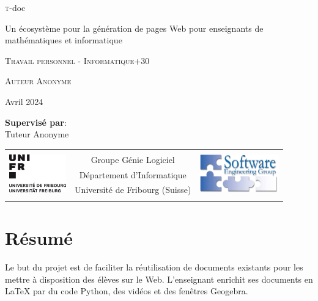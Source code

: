 \documentclass[12pt,titlepage,oneside]{article}
\newcommand{\authorname}{Caroline Blank}
\newcommand{\tutorname}{Prof. Dr. Jacques Pasquier\\
Software Engineering Group\\}
\newcommand{\titlename}{t-doc}
\newcommand{\subtitlename}{Un écosystème pour la génération de pages Web pour enseignants de mathématiques et informatique}
\newcommand{\worktype}{Travail personnel - Informatique+30}
\newcommand{\workdate}{Avril 2024}
\newcommand{\supervisorslabel}{Supervisé par}
\renewcommand{\authorname}{Auteur Anonyme}
\renewcommand{\tutorname}{Tuteur Anonyme}
\newcommand{\titlepagefooter}{
\begin{tabular}{lcr} \hline
\multirow{5}{*}{\includegraphics[height=1.65cm]{unifr_logo}} &  & \multirow{5}{*}{\includegraphics[height=1.65cm]{softeng}} \\
& Groupe Génie Logiciel &  \\
& Département d'Informatique &  \\
& Université de Fribourg (Suisse) &  \\
& & \\
\end{tabular}
}
\begin{document}
\begin{titlepage}
\begin{center}
  \vspace*{1cm}

  \begin{huge}
    \textsc\titlename \\
  \end{huge}
  \vspace{0.4cm}
  \begin{Large}
  \subtitlename
  \end{Large}



  \vspace*{2cm}

  \begin{normalsize}
  \textsc{\worktype}
  \end{normalsize}

  \vspace*{1.5cm}
  \begin{LARGE}
  \textsc{\authorname}\\
      \vspace{0.2cm}
  \end{LARGE}
  \begin{large}
    {\workdate}
  \end{large}

  \vspace*{4cm}

  \textbf{\supervisorslabel}:\\
  \vspace{0.2cm}
  \tutorname
  \vspace*{3cm}

  \titlepagefooter


\end{center}
\end{titlepage}

\section*{Résumé}
Le but du projet est de faciliter la réutilisation de documents existants pour les mettre à disposition des élèves sur le Web. L'enseignant enrichit ses documents en LaTeX par du code Python, des vidéos et des fenêtres Geogebra.
\end{document}
